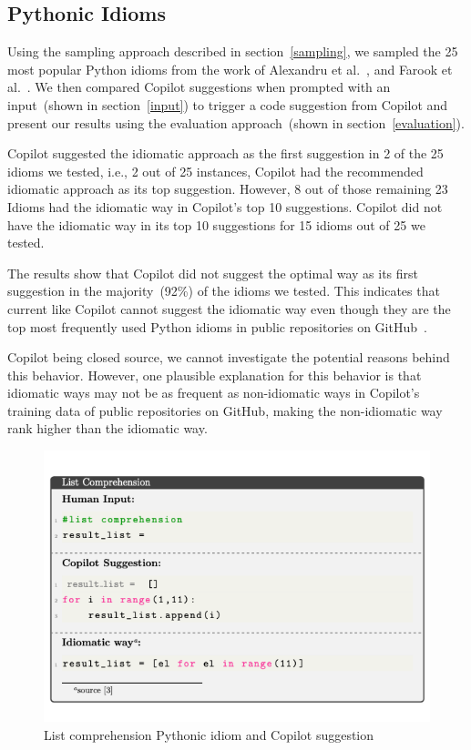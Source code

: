 \subsection{Pythonic Idioms}
\label{idioms}
Using the sampling approach described in section~\ref{sampling}, we sampled the 25 most popular Python idioms from the work of Alexandru et al.~\cite{Alexandru2018}, and Farook et al.~\cite{idioms}. 
We then compared Copilot suggestions when prompted with an input~(shown in section~\ref{input}) to trigger a code suggestion from Copilot and present our results using the evaluation approach~(shown in section~\ref{evaluation}).

Copilot suggested the idiomatic approach as the first suggestion in 2 of the 25 idioms we tested, i.e., 2 out of 25 instances, Copilot had the recommended idiomatic approach as its top suggestion. 
However, 8 out of those remaining 23 Idioms had the idiomatic way in Copilot's top 10 suggestions. Copilot did not have the idiomatic way in its top 10 suggestions for 15 idioms out of 25 we tested.

The results show that Copilot did not suggest the optimal way as its first suggestion in the majority~(92\%) of the idioms we tested. This indicates that current \cct{} like Copilot cannot suggest the idiomatic way even though they are the top most frequently used Python idioms in public repositories on GitHub~\cite{Alexandru2018, idioms}. 

Copilot being closed source, we cannot investigate the potential reasons behind this behavior. However, one plausible explanation for this behavior is that idiomatic ways may not be as frequent as non-idiomatic ways in Copilot's training data of public repositories on GitHub, making the non-idiomatic way rank higher than the idiomatic way.

\begin{figure}[hbt!]
    \centering
    \includegraphics[width=\linewidth]{Figures/idioms_1.png}
    \caption{List comprehension Pythonic idiom and Copilot suggestion}
    \label{fig:idioms_1}
\end{figure}

